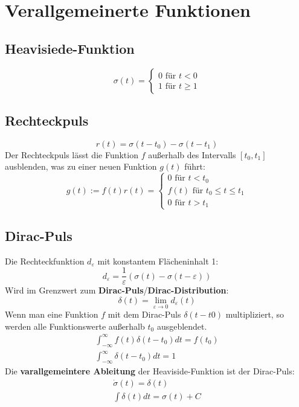 \documentclass[12pt]{article}
\begin{document}
\section{Verallgemeinerte Funktionen}
\subsection{Heavisiede-Funktion}
\begin{equation*}
	\sigma(t)=\begin{cases}
		0 \text{ für } t<0\\
		1 \text{ für } t\geq 1
	\end{cases}
\end{equation*}
\subsection{Rechteckpuls}
\begin{equation*}
	r(t)=\sigma(t-t_0)-\sigma(t-t_1)
\end{equation*}
Der Rechteckpuls lässt die Funktion $f$ außerhalb des Intervalls $[t_0,t_1]$ ausblenden, was zu einer neuen Funktion $g(t)$ führt:
\begin{equation*}
	g(t):=f(t)r(t)=\begin{cases}
		0 \text{ für } t<t_0\\
		f(t) \text{ für } t_0\leq t \leq t_1\\
		0 \text{ für } t>t_1
	\end{cases}
\end{equation*}
\subsection{Dirac-Puls}
Die Rechteckfunktion $d_\varepsilon$ mit konstantem Flächeninhalt 1:
\begin{equation*}
	d_\varepsilon=\frac{1}{\varepsilon}(\sigma(t)-\sigma(t-\varepsilon))
\end{equation*}
Wird im Grenzwert zum \textbf{Dirac-Puls}/\textbf{Dirac-Distribution}:
\begin{equation*}
	\delta(t)=\lim_{\varepsilon\rightarrow 0}d_\varepsilon(t)
\end{equation*}
Wenn man eine Funktion $f$ mit dem Dirac-Puls $\delta(t-t0)$ multipliziert, so werden alle Funktionswerte außerhalb $t_0$ ausgeblendet.
\begin{gather*}
	\int_{-\infty}^{\infty}f(t)\delta(t-t_0)dt=f(t_0)\\
	\int_{-\infty}^{\infty}\delta(t-t_0)dt=1
\end{gather*}
Die \textbf{varallgemeintere Ableitung} der Heaviside-Funktion ist der Dirac-Puls:
\begin{gather*}
	\dot{\sigma}(t)=\delta(t)\\
	\int\delta(t)dt=\sigma(t)+C
\end{gather*}
\end{document}
